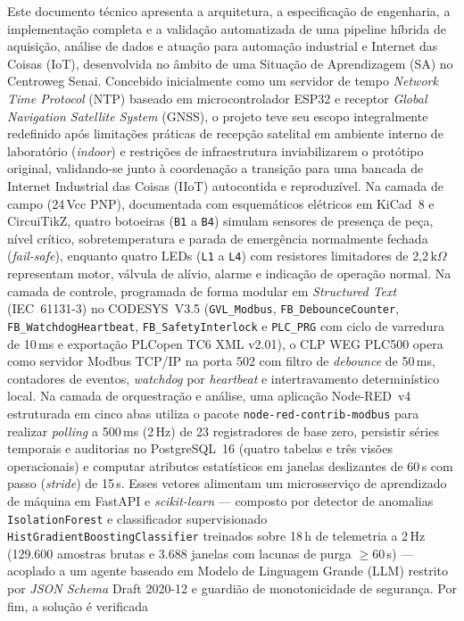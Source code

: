 
\setlength{\absparsep}{18pt}
\begin{resumo}
Este documento técnico apresenta a arquitetura, a especificação de engenharia, a implementação completa e a validação automatizada de uma pipeline híbrida de aquisição, análise de dados e atuação para automação industrial e Internet das Coisas (IoT), desenvolvida no âmbito de uma Situação de Aprendizagem (SA) no Centroweg Senai. Concebido inicialmente como um servidor de tempo \textit{Network Time Protocol} (NTP) baseado em microcontrolador ESP32 e receptor \textit{Global Navigation Satellite System} (GNSS), o projeto teve seu escopo integralmente redefinido após limitações práticas de recepção satelital em ambiente interno de laboratório (\textit{indoor}) e restrições de infraestrutura inviabilizarem o protótipo original, validando-se junto à coordenação a transição para uma bancada de Internet Industrial das Coisas (IIoT) autocontida e reproduzível. Na camada de campo (24\,Vcc PNP), documentada com esquemáticos elétricos em KiCad~8 e CircuiTikZ, quatro botoeiras (\texttt{B1} a \texttt{B4}) simulam sensores de presença de peça, nível crítico, sobretemperatura e parada de emergência normalmente fechada (\textit{fail-safe}), enquanto quatro LEDs (\texttt{L1} a \texttt{L4}) com resistores limitadores de 2,2\,k$\Omega$ representam motor, válvula de alívio, alarme e indicação de operação normal. Na camada de controle, programada de forma modular em \textit{Structured Text} (IEC~61131-3) no CODESYS~V3.5 (\texttt{GVL\_Modbus}, \texttt{FB\_\allowbreak Debounce\allowbreak Counter}, \texttt{FB\_\allowbreak Watchdog\allowbreak Heartbeat}, \texttt{FB\_\allowbreak Safety\allowbreak Interlock} e \texttt{PLC\_PRG} com ciclo de varredura de 10\,ms e exportação PLCopen TC6 XML v2.01), o CLP WEG PLC500 opera como servidor Modbus TCP/IP na porta 502 com filtro de \textit{debounce} de 50\,ms, contadores de eventos, \textit{watchdog} por \textit{heartbeat} e intertravamento determinístico local. Na camada de orquestração e análise, uma aplicação Node-RED~v4 estruturada em cinco abas utiliza o pacote \texttt{node-red-\allowbreak contrib-\allowbreak modbus} para realizar \textit{polling} a 500\,ms (2\,Hz) de 23 registradores de base zero, persistir séries temporais e auditorias no PostgreSQL~16 (quatro tabelas e três visões operacionais) e computar atributos estatísticos em janelas deslizantes de 60\,s com passo (\textit{stride}) de 15\,s. Esses vetores alimentam um microsserviço de aprendizado de máquina em FastAPI e \textit{scikit-learn} --- composto por detector de anomalias \texttt{Isolation\allowbreak Forest} e classificador supervisionado \texttt{HistGradient\allowbreak Boosting\allowbreak Classifier} treinados sobre 18\,h de telemetria a 2\,Hz (129.600 amostras brutas e 3.688 janelas com lacunas de purga $\ge 60$\,s) --- acoplado a um agente baseado em Modelo de Linguagem Grande (LLM) restrito por \textit{JSON Schema} Draft 2020-12 e guardião de monotonicidade de segurança. Por fim, a solução é verificada 
\end{resumo}
